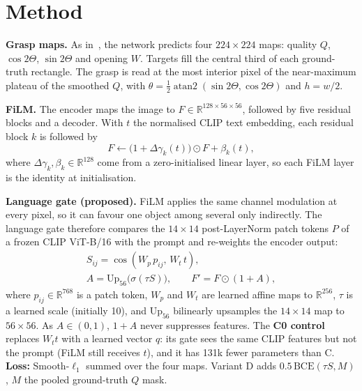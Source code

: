 \section{Method}
\textbf{Grasp maps.} As in~\cite{kumra2020antipodal}, the network predicts four $224{\times}224$ maps: quality $Q$, $\cos2\Theta$, $\sin2\Theta$ and opening $W$. Targets fill the central third of each ground-truth rectangle. The grasp is read at the most interior pixel of the near-maximum plateau of the smoothed $Q$, with $\theta=\tfrac12\operatorname{atan2}(\sin2\Theta,\cos2\Theta)$ and $h=w/2$.

\textbf{FiLM.} The encoder maps the image to $F\in\mathbb{R}^{128\times56\times56}$, followed by five residual blocks and a decoder. With $t$ the normalised CLIP text embedding, each residual block $k$ is followed by
\begin{equation}
F \leftarrow \big(1+\Delta\gamma_k(t)\big)\odot F + \beta_k(t),
\end{equation}
where $\Delta\gamma_k,\beta_k\in\mathbb{R}^{128}$ come from a zero-initialised linear layer, so each FiLM layer is the identity at initialisation.

\textbf{Language gate (proposed).} FiLM applies the same channel modulation at every pixel, so it can favour one object among several only indirectly. The language gate therefore compares the $14{\times}14$ post-LayerNorm patch tokens $P$ of a frozen CLIP ViT-B/16 with the prompt and re-weights the encoder output:
\begin{equation}
\begin{gathered}
S_{ij}=\cos(W_p\,p_{ij},\,W_t\,t),\\
A=\mathrm{Up}_{56}\big(\sigma(\tau S)\big),\qquad F'=F\odot(1+A),
\end{gathered}
\end{equation}
where $p_{ij}\in\mathbb{R}^{768}$ is a patch token, $W_p$ and $W_t$ are learned affine maps to $\mathbb{R}^{256}$, $\tau$ is a learned scale (initially 10), and $\mathrm{Up}_{56}$ bilinearly upsamples the $14{\times}14$ map to $56{\times}56$. As $A\in(0,1)$, $1{+}A$ never suppresses features. The \textbf{C0 control} replaces $W_t t$ with a learned vector $q$: its gate sees the same CLIP features but not the prompt (FiLM still receives $t$), and it has 131k fewer parameters than C. \textbf{Loss:} Smooth-$\ell_1$ summed over the four maps. Variant D adds $0.5\,\mathrm{BCE}(\tau S, M)$, $M$ the pooled ground-truth $Q$ mask.
